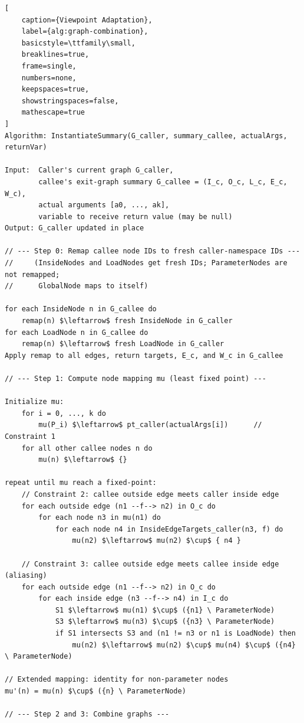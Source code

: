 \begin{lstlisting}[
    caption={Viewpoint Adaptation}, 
    label={alg:graph-combination},
    basicstyle=\ttfamily\small,
    breaklines=true,
    frame=single,
    numbers=none,
    keepspaces=true,
    showstringspaces=false,
    mathescape=true
]
Algorithm: InstantiateSummary(G_caller, summary_callee, actualArgs, returnVar)

Input:  Caller's current graph G_caller,
        callee's exit-graph summary G_callee = (I_c, O_c, L_c, E_c, W_c),
        actual arguments [a0, ..., ak],
        variable to receive return value (may be null)
Output: G_caller updated in place

// --- Step 0: Remap callee node IDs to fresh caller-namespace IDs ---
//     (InsideNodes and LoadNodes get fresh IDs; ParameterNodes are not remapped;
//      GlobalNode maps to itself)

for each InsideNode n in G_callee do
    remap(n) $\leftarrow$ fresh InsideNode in G_caller
for each LoadNode n in G_callee do
    remap(n) $\leftarrow$ fresh LoadNode in G_caller
Apply remap to all edges, return targets, E_c, and W_c in G_callee

// --- Step 1: Compute node mapping mu (least fixed point) ---

Initialize mu:
    for i = 0, ..., k do
        mu(P_i) $\leftarrow$ pt_caller(actualArgs[i])      // Constraint 1
    for all other callee nodes n do
        mu(n) $\leftarrow$ {}

repeat until mu reach a fixed-point:
    // Constraint 2: callee outside edge meets caller inside edge
    for each outside edge (n1 --f--> n2) in O_c do
        for each node n3 in mu(n1) do
            for each node n4 in InsideEdgeTargets_caller(n3, f) do
                mu(n2) $\leftarrow$ mu(n2) $\cup$ { n4 }

    // Constraint 3: callee outside edge meets callee inside edge (aliasing)
    for each outside edge (n1 --f--> n2) in O_c do
        for each inside edge (n3 --f--> n4) in I_c do
            S1 $\leftarrow$ mu(n1) $\cup$ ({n1} \ ParameterNode)
            S3 $\leftarrow$ mu(n3) $\cup$ ({n3} \ ParameterNode)
            if S1 intersects S3 and (n1 != n3 or n1 is LoadNode) then
                mu(n2) $\leftarrow$ mu(n2) $\cup$ mu(n4) $\cup$ ({n4} \ ParameterNode)

// Extended mapping: identity for non-parameter nodes
mu'(n) = mu(n) $\cup$ ({n} \ ParameterNode)

// --- Step 2 and 3: Combine graphs ---


\end{lstlisting}
